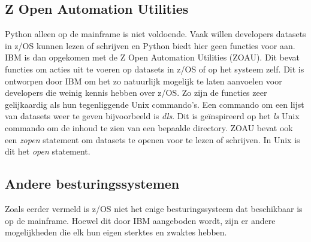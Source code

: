 \subsection{Z Open Automation Utilities}
Python alleen op de mainframe is niet voldoende. Vaak willen developers datasets in z/OS kunnen lezen of schrijven en Python biedt hier geen functies voor aan. IBM is dan opgekomen met de Z Open Automation Utilities (ZOAU). Dit bevat functies om acties uit te voeren op datasets in z/OS of op het systeem zelf. Dit is ontworpen door IBM om het zo natuurlijk mogelijk te laten aanvoelen voor developers die weinig kennis hebben over z/OS. Zo zijn de functies zeer gelijkaardig als hun tegenliggende Unix commando's. Een commando om een lijst van datasets weer te geven bijvoorbeeld is \textit{dls}. Dit is geïnspireerd op het \textit{ls} Unix commando om de inhoud te zien van een bepaalde directory. ZOAU bevat ook een \textit{zopen} statement om datasets te openen voor te lezen of schrijven. In Unix is dit het \textit{open} statement. \autocite{IBM2023a}

\subsection{Andere besturingssystemen}
Zoals eerder vermeld is z/OS niet het enige besturingssysteem dat beschikbaar is op de mainframe. Hoewel dit door IBM aangeboden wordt, zijn er andere mogelijkheden die elk hun eigen sterktes en zwaktes hebben. \\

